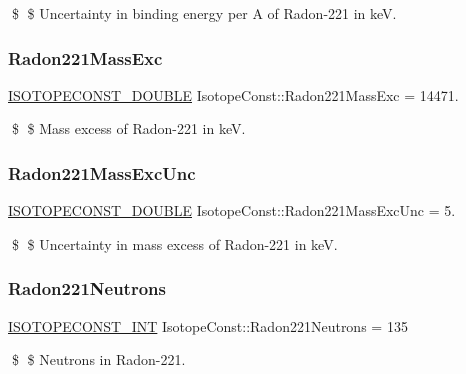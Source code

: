\$ \$ Uncertainty in binding energy per A of Radon-\/221 in keV. \mbox{\label{group___isotope_const-_radon-_rn221_ga2db7446721cd48c82cbaa415d36bb501}} 
\subsubsection{\texorpdfstring{Radon221\+Mass\+Exc}{Radon221MassExc}}
{\footnotesize\ttfamily \mbox{\hyperlink{group___isotope_const-_macros_ga8f45a7272ce02c0b4c65c44636ed719a}{I\+S\+O\+T\+O\+P\+E\+C\+O\+N\+S\+T\+\_\+\+D\+O\+U\+B\+LE}} Isotope\+Const\+::\+Radon221\+Mass\+Exc = 14471.}

\$ \$ Mass excess of Radon-\/221 in keV. \mbox{\label{group___isotope_const-_radon-_rn221_ga9c0c6e9f6d5b8331c73d9d643a28c095}} 
\subsubsection{\texorpdfstring{Radon221\+Mass\+Exc\+Unc}{Radon221MassExcUnc}}
{\footnotesize\ttfamily \mbox{\hyperlink{group___isotope_const-_macros_ga8f45a7272ce02c0b4c65c44636ed719a}{I\+S\+O\+T\+O\+P\+E\+C\+O\+N\+S\+T\+\_\+\+D\+O\+U\+B\+LE}} Isotope\+Const\+::\+Radon221\+Mass\+Exc\+Unc = 5.}

\$ \$ Uncertainty in mass excess of Radon-\/221 in keV. \mbox{\label{group___isotope_const-_radon-_rn221_ga99c25c3d5001e80f2a70e4a7f0e7fb4b}} 
\subsubsection{\texorpdfstring{Radon221\+Neutrons}{Radon221Neutrons}}
{\footnotesize\ttfamily \mbox{\hyperlink{group___isotope_const-_macros_ga5f18360b3e99483a35c32d789e62621c}{I\+S\+O\+T\+O\+P\+E\+C\+O\+N\+S\+T\+\_\+\+I\+NT}} Isotope\+Const\+::\+Radon221\+Neutrons = 135}

\$ \$ Neutrons in Radon-\/221. \mbox{\label{group___isotope_const-_radon-_rn221_ga1f437e9d1aa4a2e8a9f1eadbbb99b385}} 
